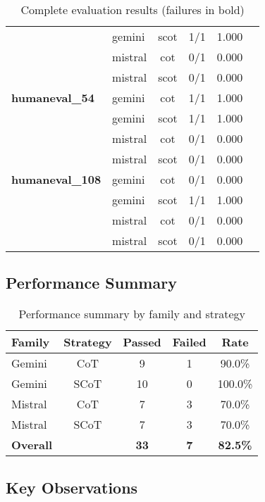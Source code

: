 \documentclass[11pt]{article}
\begin{document}
\begin{table}[h]
\begin{tabular}{llcccc}
 & gemini & scot & 1/1 & 1.000 \\
 & mistral & cot & 0/1 & 0.000 \\
 & mistral & scot & 0/1 & 0.000 \\
\midrule
\textbf{humaneval\_54} & gemini & cot & 1/1 & 1.000 \\
 & gemini & scot & 1/1 & 1.000 \\
 & mistral & cot & 0/1 & 0.000 \\
 & mistral & scot & 0/1 & 0.000 \\
\midrule
\textbf{humaneval\_108} & gemini & cot & 0/1 & 0.000 \\
 & gemini & scot & 1/1 & 1.000 \\
 & mistral & cot & 0/1 & 0.000 \\
 & mistral & scot & 0/1 & 0.000 \\
\bottomrule
\end{tabular}
\caption{Complete evaluation results (failures in bold)}
\label{tab:results}
\end{table}

\subsection{Performance Summary}

\begin{table}[h]
\centering
\begin{tabular}{lcccc}
\toprule
\textbf{Family} & \textbf{Strategy} & \textbf{Passed} & \textbf{Failed} & \textbf{Rate} \\
\midrule
Gemini & CoT & 9 & 1 & 90.0\% \\
Gemini & SCoT & 10 & 0 & 100.0\% \\
Mistral & CoT & 7 & 3 & 70.0\% \\
Mistral & SCoT & 7 & 3 & 70.0\% \\
\midrule
\textbf{Overall} & & \textbf{33} & \textbf{7} & \textbf{82.5\%} \\
\bottomrule
\end{tabular}
\caption{Performance summary by family and strategy}
\label{tab:summary}
\end{table}

\subsection{Key Observations}
\end{document}
